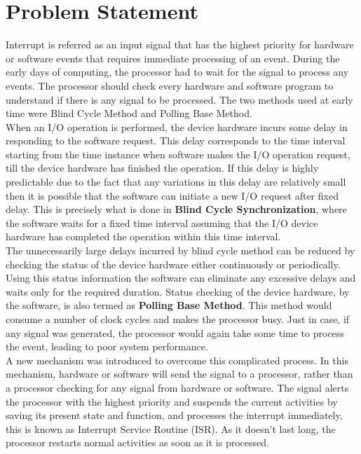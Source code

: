 \chapter{Problem Statement}
\label{Chapter2}
Interrupt is referred as an input signal that has the highest priority for hardware or software events that requires immediate processing of an event. During the early days of computing, the processor had to wait for the signal to process any events. The processor should check every hardware and software program to understand if there is any signal to be processed. The two methods used at early time were Blind Cycle Method and Polling Base Method.\\

When an I/O operation is performed, the device hardware incurs some delay in responding to the software request. This delay corresponds to the time interval starting from the time instance when software makes the I/O operation request, till the device hardware has finished the operation. If this delay is highly predictable due to the fact that any variations in this delay are relatively small then it is possible that the software can initiate a new I/O request after fixed delay. This is precisely what is done in \textbf{Blind Cycle Synchronization}, where the software waits for a fixed time interval assuming that the I/O device hardware has completed the operation within this time interval.\\

The unnecessarily large delays incurred by blind cycle method can be reduced by checking the status of the device hardware either continuously or periodically. Using this status information the software can eliminate any excessive delays and waits only for the
required duration. Status checking of the device hardware, by the software, is also termed as \textbf{Polling Base Method}. This method would consume a number of clock cycles and makes the processor busy. Just in case, if any signal was generated, the processor would again take some time to process the event, leading to poor system performance. \\

A new mechanism was introduced to overcome this complicated process. In this mechanism, hardware or software will send the signal to a processor, rather than a processor checking for any signal from hardware or software. The signal alerts the processor with the highest priority and suspends the current activities by saving its present state and function, and processes the interrupt immediately, this is known as Interrupt Service Routine (ISR). As it doesn’t last long, the processor restarts normal activities as soon as it is processed.

